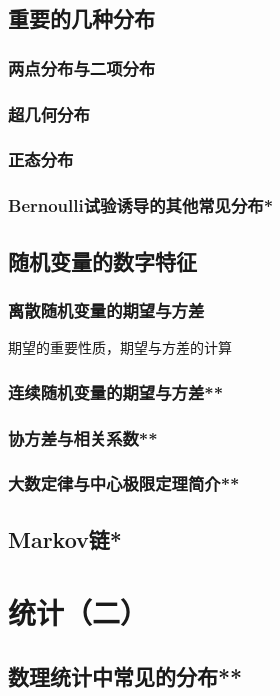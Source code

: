 \section{重要的几种分布}
\subsection{两点分布与二项分布}
\clearpage
\subsection{超几何分布}
\clearpage
\subsection{正态分布}
\clearpage
\subsection{Bernoulli试验诱导的其他常见分布*}
\clearpage


\section{随机变量的数字特征}
\subsection{离散随机变量的期望与方差}
期望的重要性质，期望与方差的计算
\clearpage
\subsection{连续随机变量的期望与方差**}
\clearpage
\subsection{协方差与相关系数**}
\clearpage
\subsection{大数定律与中心极限定理简介**}
\clearpage


\section{Markov链*}
\clearpage


\chapter{统计（二）}
\section{数理统计中常见的分布**}
